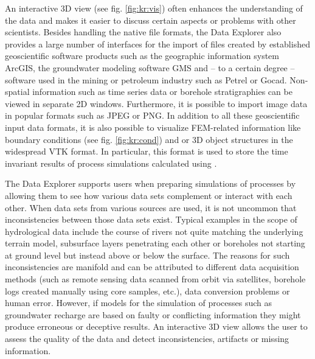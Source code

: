 An interactive 3D view (see fig. \ref{fig:kr:vis}) often enhances the understanding of the data and makes it easier to discuss certain aspects or problems with other scientists. Besides handling the native \ogs file formats, the Data Explorer also provides a large number of interfaces for the import of files created by established geoscientific software products such as the geographic information system ArcGIS, the groundwater modeling software GMS and -- to a certain degree -- software used in the mining or petroleum industry such as Petrel or Gocad. Non-spatial information such as time series data or borehole stratigraphies can be viewed in separate 2D windows. Furthermore, it is possible to import image data in popular formats such as JPEG or PNG. In addition to all these geoscientific input data formats, it is also possible to visualize FEM-related information like boundary conditions (see fig. \ref{fig:kr:cond}) and  or 3D object structures in the widespread VTK format. In particular, this format is used to store the time invariant results of process simulations calculated using \ogs.

The Data Explorer supports users when preparing simulations of processes by allowing them to see how various data sets complement or interact with each other. When data sets from various sources are used, it is not uncommon that inconsistencies between those data sets exist. Typical examples in the scope of hydrological data include the course of rivers not quite matching the underlying terrain model, subsurface layers penetrating each other or boreholes not starting at ground level but instead above or below the surface. The reasons for such inconsistencies are manifold and can be attributed to different data acquisition methods (such as remote sensing data scanned from orbit via satellites, borehole logs created manually using core samples, etc.), data conversion problems or human error.  However, if models for the simulation of processes such as groundwater recharge are based on faulty or conflicting information they might produce erroneous or deceptive results. An interactive 3D view allows the user to assess the quality of the data and detect inconsistencies, artifacts or missing information.

